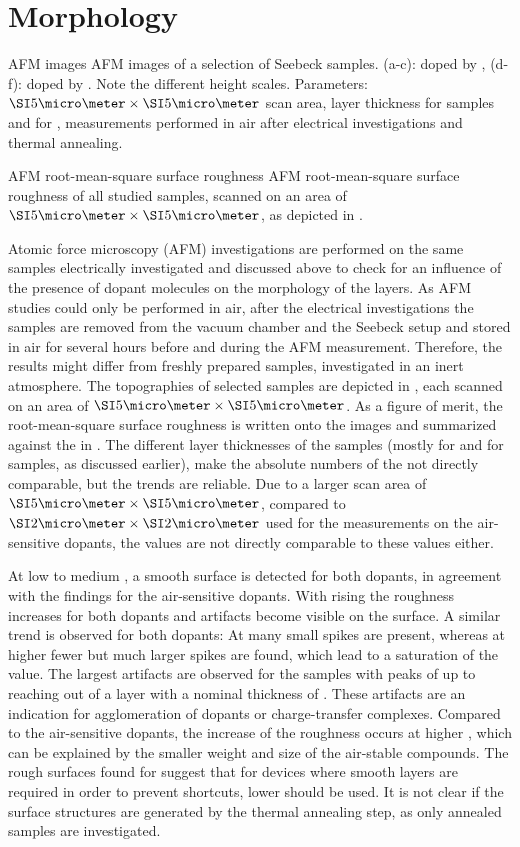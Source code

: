 \section{Morphology}\label{sec:ResASAFM}
%
%
{AFM images}%
{AFM images of a selection of Seebeck samples. \mbox{(a-c)}: \CS doped by \aob, \mbox{(d-f)}: \CS doped by \dmbi. Note the different height scales. Parameters: $\um{5}\times\um{5}$ scan area,  layer thickness for \aob samples and  for \dmbi, measurements performed in air after electrical investigations and thermal annealing.
}

%
{AFM root-mean-square surface roughness \rms}
{AFM root-mean-square surface roughness \rms of all studied samples, scanned on an area of $\um{5}\times\um{5}$, as depicted in .
}

Atomic force microscopy (AFM) investigations are performed on the same samples electrically investigated and discussed above to check for an influence of the presence of dopant molecules on the morphology of the layers.
As AFM studies could only be performed in air, after the electrical investigations the samples are removed from the vacuum chamber and the Seebeck setup and stored in air for several hours before and during the AFM measurement.
Therefore, the results might differ from freshly prepared samples, investigated in an inert atmosphere.
The topographies of selected samples are depicted in , each scanned on an area of $\um{5}\times\um{5}$.
As a figure of merit, the root-mean-square surface roughness \rms is written onto the images and summarized against the \CLong in .
%
The different layer thicknesses of the samples (mostly  for \dmbi and  for \aob samples, as discussed earlier), make the absolute numbers of the \rms not directly comparable, but the trends are reliable.
Due to a larger scan area of $\um{5}\times\um{5}$, compared to $\um{2}\times\um{2}$ used for the measurements on the air-sensitive dopants, the \rms values are not directly comparable to these values either.

At low to medium \CLongs, a smooth surface is detected for both dopants, in agreement with the findings for the air-sensitive dopants. With rising \CLong the roughness increases for both dopants and artifacts become visible on the surface. A similar trend is observed for both dopants: At \C[0.240] many small spikes are present, whereas at higher \CLongs fewer but much larger spikes are found, which lead to a saturation of the \rms value. The largest artifacts are observed for the \dmbi samples with peaks of up to  reaching out of a layer with a nominal thickness of .
These artifacts are an indication for agglomeration of dopants or charge-transfer complexes.
Compared to the air-sensitive dopants, the increase of the roughness occurs at higher \CLongs, which can be explained by the smaller weight and size of the air-stable compounds. The rough surfaces found for  suggest that for devices where smooth layers are required in order to prevent shortcuts, lower \CLongs should be used.
It is not clear if the surface structures are generated by the thermal annealing step, as only annealed samples are investigated.

